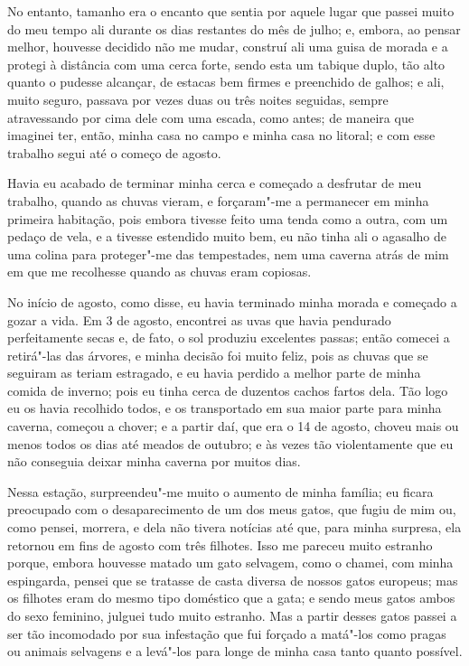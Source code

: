 No entanto, tamanho era o encanto que sentia por aquele lugar que passei
muito do meu tempo ali durante os dias restantes do mês de julho; e,
embora, ao pensar melhor, houvesse decidido não me mudar, construí ali
uma guisa de morada e a protegi à distância com uma cerca forte, sendo
esta um tabique duplo, tão alto quanto o pudesse alcançar, de estacas
bem firmes e preenchido de galhos; e ali, muito seguro, passava por
vezes duas ou três noites seguidas, sempre atravessando por cima dele
com uma escada, como antes; de maneira que imaginei ter, então, minha
casa no campo e minha casa no litoral; e com esse trabalho segui até o
começo de agosto.

Havia eu acabado de terminar minha cerca e começado a desfrutar de meu
trabalho, quando as chuvas vieram, e forçaram"-me a permanecer em minha
primeira habitação, pois embora tivesse feito uma tenda como a outra,
com um pedaço de vela, e a tivesse estendido muito bem, eu não tinha ali
o agasalho de uma colina para proteger"-me das tempestades, nem uma
caverna atrás de mim em que me recolhesse quando as chuvas eram
copiosas.

No início de agosto, como disse, eu havia terminado minha morada e
começado a gozar a vida. Em 3 de agosto, encontrei as uvas que havia
pendurado perfeitamente secas e, de fato, o sol produziu excelentes
passas; então comecei a retirá"-las das árvores, e minha decisão foi
muito feliz, pois as chuvas que se seguiram as teriam estragado, e eu
havia perdido a melhor parte de minha comida de inverno; pois eu tinha
cerca de duzentos cachos fartos dela. Tão logo eu os havia recolhido
todos, e os transportado em sua maior parte para minha caverna, começou
a chover; e a partir daí, que era o 14 de agosto, choveu mais ou menos
todos os dias até meados de outubro; e às vezes tão violentamente que eu
não conseguia deixar minha caverna por muitos dias.

Nessa estação, surpreendeu"-me muito o aumento de minha família; eu
ficara preocupado com o desaparecimento de um dos meus gatos, que fugiu
de mim ou, como pensei, morrera, e dela não tivera notícias até que,
para minha surpresa, ela retornou em fins de agosto com três filhotes.
Isso me pareceu muito estranho porque, embora houvesse matado um gato
selvagem, como o chamei, com minha espingarda, pensei que se tratasse de
casta diversa de nossos gatos europeus; mas os filhotes eram do mesmo
tipo doméstico que a gata; e sendo meus gatos ambos do sexo feminino,
julguei tudo muito estranho. Mas a partir desses gatos passei a ser tão
incomodado por sua infestação que fui forçado a matá"-los como pragas ou
animais selvagens e a levá"-los para longe de minha casa tanto quanto
possível.

